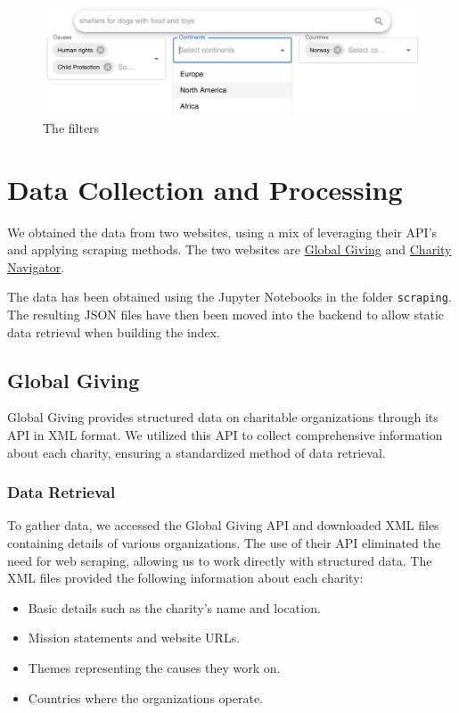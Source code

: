 \documentclass[unicode,9pt,a4paper,oneside,numbers=endperiod,openany]{scrartcl}
\begin{document}
\begin{figure}[h]
    \centering
    \includegraphics[width=0.6\linewidth]{fig/filters.png}
    \caption{The filters}
\end{figure}

\section{Data Collection and Processing}

We obtained the data from two websites, using a mix of leveraging their API's and applying scraping methods.
The two websites are \href{https://www.globalgiving.org}{Global Giving} and \href{https://www.charitynavigator.org}{Charity Navigator}.

The data has been obtained using the Jupyter Notebooks in the folder \texttt{scraping}. The resulting JSON files have then been moved into the backend to allow static data retrieval when building the index.


\subsection{Global Giving}
Global Giving provides structured data on charitable organizations through its API in XML format. We utilized this API to collect comprehensive information about each charity, ensuring a standardized method of data retrieval.

\subsubsection{Data Retrieval}
To gather data, we accessed the Global Giving API and downloaded XML files containing details of various organizations. The use of their API eliminated the need for web scraping, allowing us to work directly with structured data. The XML files provided the following information about each charity:
\begin{itemize}
    \item Basic details such as the charity's name and location.
    \item Mission statements and website URLs.
    \item Themes representing the causes they work on.
    \item Countries where the organizations operate.
\end{itemize}
\end{document}
